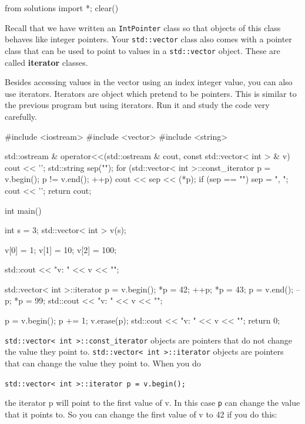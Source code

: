 \begin{python0}
from solutions import *; clear()
\end{python0}

Recall that we have written an \texttt{IntPointer} class so that objects
of this class behaves like integer pointers. Your \texttt{std::vector}
class also comes with a pointer class that can be used to point to
values in a \texttt{std::vector} object. These are called
\textbf{iterator} classes.

Besides accessing values in the vector using an index integer value, you
can also use iterators. Iterators are object which pretend to be
pointers. This is similar to the previous program but using iterators.
Run it and study the code very carefully.
\begin{console}
#include <iostream>
#include <vector>
#include <string>

std::ostream & operator<<(std::ostream & cout,
             const std::vector< int > & v)
{    
     cout << '{';
     std::string sep("");
     for (std::vector< int >::const_iterator p =
                                             v.begin();
          p != v.end(); ++p)
          { 
              cout << sep << (*p);
              if (sep == "") sep = ", ";
          }
          cout << '}';
          return cout;
}

int main()
{   
    int s = 3;
    std::vector< int > v(s);
    
    v[0] = 1; v[1] = 10; v[2] = 100;

    std::cout << "v: " << v << "\n";

    std::vector< int >::iterator p = v.begin();
    *p = 42;
    ++p;
    *p = 43;
    p = v.end();
    --p;
    *p = 99;
    std::cout << "v: " << v << "\n";

    p = v.begin();
    p += 1;
    v.erase(p);
    std::cout << "v: " << v << "\n";
    return 0;

} 
\end{console}

\texttt{std::vector< int >::const\_iterator} objects
are pointers that do not change the value they point to.
\texttt{std::vector< int >::iterator} objects are
pointers that can change the value they point to. When you do
\begin{center}
\texttt{std::vector< int >::iterator p = v.begin();}
\end{center}
the iterator p will point to the first value of v. In this case \texttt{p}
can change the value that it points to. So you can change the first
value of v to 42 if you do this:

